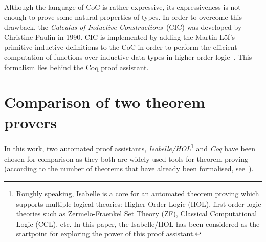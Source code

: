 \documentclass[article]{aaltoseries}
\begin{document}
Although the language of CoC is rather expressive, its expressiveness is not enough to prove some natural properties of types. In order to overcome this drawback, the \textit{Calculus of Inductive Constructions}~(CIC) was developed by Christine Paulin in 1990. CIC is implemented by adding the Martin-Löf's primitive inductive definitions to the CoC in order to perform the efficient computation of functions over inductive data types in higher-order logic~\cite{Paulin15}. This formalism lies behind the Coq proof assistant.




		




\section{Comparison of two theorem provers}
\label{sec:comparison}

In this work, two automated proof assistants, \textit{Isabelle/HOL}\footnote{Roughly speaking, Isabelle is a core for an automated theorem proving which supports multiple logical theories: Higher-Order Logic (HOL), first-order logic theories such as Zermelo-Fraenkel Set Theory (ZF), Classical Computational Logic (CCL), etc. In this paper, the Isabelle/HOL has been considered as the startpoint for exploring the power of this proof assistant.} and \textit{Coq} have been chosen for comparison as they both are widely used tools for theorem proving (according to the number of theorems that have already been formalised, see~\cite{Wiedijk100}). 
\end{document}

